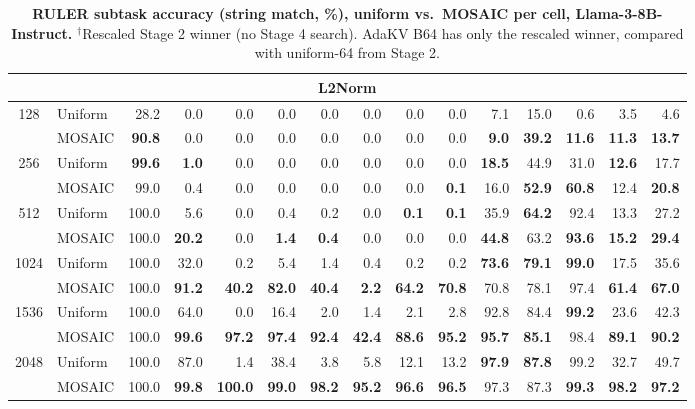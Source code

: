\begin{table}[tp]
\begin{tabular}{@{} c l rrrrrrrrrrrrr @{}}
    \midrule
    \multicolumn{15}{c}{\textbf{L2Norm}} \\
    \midrule
    \multirow{2}{*}{128} & Uniform & 28.2 & 0.0 & 0.0 & 0.0 & 0.0 & 0.0 & 0.0 & 0.0 & 7.1 & 15.0 & 0.6 & 3.5 & 4.6 \\
     & MOSAIC & \textbf{90.8} & 0.0 & 0.0 & 0.0 & 0.0 & 0.0 & 0.0 & 0.0 & \textbf{9.0} & \textbf{39.2} & \textbf{11.6} & \textbf{11.3} & \textbf{13.7} \\
    \cmidrule(l){1-15}
    \multirow{2}{*}{256} & Uniform & \textbf{99.6} & \textbf{1.0} & 0.0 & 0.0 & 0.0 & 0.0 & 0.0 & 0.0 & \textbf{18.5} & 44.9 & 31.0 & \textbf{12.6} & 17.7 \\
     & MOSAIC & 99.0 & 0.4 & 0.0 & 0.0 & 0.0 & 0.0 & 0.0 & \textbf{0.1} & 16.0 & \textbf{52.9} & \textbf{60.8} & 12.4 & \textbf{20.8} \\
    \cmidrule(l){1-15}
    \multirow{2}{*}{512} & Uniform & 100.0 & 5.6 & 0.0 & 0.4 & 0.2 & 0.0 & \textbf{0.1} & \textbf{0.1} & 35.9 & \textbf{64.2} & 92.4 & 13.3 & 27.2 \\
     & MOSAIC & 100.0 & \textbf{20.2} & 0.0 & \textbf{1.4} & \textbf{0.4} & 0.0 & 0.0 & 0.0 & \textbf{44.8} & 63.2 & \textbf{93.6} & \textbf{15.2} & \textbf{29.4} \\
    \cmidrule(l){1-15}
    \multirow{2}{*}{1024} & Uniform & 100.0 & 32.0 & 0.2 & 5.4 & 1.4 & 0.4 & 0.2 & 0.2 & \textbf{73.6} & \textbf{79.1} & \textbf{99.0} & 17.5 & 35.6 \\
     & MOSAIC & 100.0 & \textbf{91.2} & \textbf{40.2} & \textbf{82.0} & \textbf{40.4} & \textbf{2.2} & \textbf{64.2} & \textbf{70.8} & 70.8 & 78.1 & 97.4 & \textbf{61.4} & \textbf{67.0} \\
    \cmidrule(l){1-15}
    \multirow{2}{*}{1536} & Uniform & 100.0 & 64.0 & 0.0 & 16.4 & 2.0 & 1.4 & 2.1 & 2.8 & 92.8 & 84.4 & \textbf{99.2} & 23.6 & 42.3 \\
     & MOSAIC & 100.0 & \textbf{99.6} & \textbf{97.2} & \textbf{97.4} & \textbf{92.4} & \textbf{42.4} & \textbf{88.6} & \textbf{95.2} & \textbf{95.7} & \textbf{85.1} & 98.4 & \textbf{89.1} & \textbf{90.2} \\
    \cmidrule(l){1-15}
    \multirow{2}{*}{2048} & Uniform & 100.0 & 87.0 & 1.4 & 38.4 & 3.8 & 5.8 & 12.1 & 13.2 & \textbf{97.9} & \textbf{87.8} & 99.2 & 32.7 & 49.7 \\
     & MOSAIC & 100.0 & \textbf{99.8} & \textbf{100.0} & \textbf{99.0} & \textbf{98.2} & \textbf{95.2} & \textbf{96.6} & \textbf{96.5} & 97.3 & 87.3 & \textbf{99.3} & \textbf{98.2} & \textbf{97.2} \\
    \bottomrule
  \end{tabular}
  \caption{\textbf{RULER subtask accuracy (string match, \%), uniform vs.\ MOSAIC per cell, Llama-3-8B-Instruct.} $^\dagger$Rescaled Stage 2 winner (no Stage 4 search). AdaKV B64 has only the rescaled winner, compared with uniform-64 from Stage 2.}
  \label{tab:app-ruler}
\end{table}

